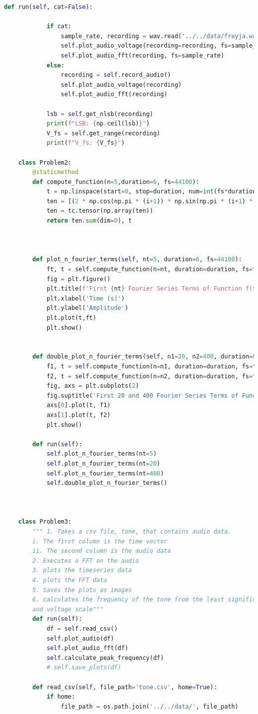 \documentclass[]{report}
\begin{document}
\begin{lstlisting}[language=Python]
		def run(self, cat=False):
		
			if cat:
				sample_rate, recording = wav.read('../../data/freyja.wav', 'rb')
				self.plot_audio_voltage(recording=recording, fs=sample_rate)
				self.plot_audio_fft(recording, fs=sample_rate)
			else:
				recording = self.record_audio()
				self.plot_audio_voltage(recording)
				self.plot_audio_fft(recording)
			
			lsb = self.get_nlsb(recording)
			print(f"LSB: {np.ceil(lsb)}")
			V_fs = self.get_range(recording)
			print(f"V_fs: {V_fs}")
	
	class Problem2:
		@staticmethod
		def compute_function(n=5,duration=6, fs=44100):
			t = np.linspace(start=0, stop=duration, num=int(fs*duration))
			ten = [(2 * np.cos(np.pi * (i+1)) * np.sin(np.pi * (i+1) * t )) / (np.pi * (i+1)) for i in range(n)]
			ten = tc.tensor(np.array(ten))
			return ten.sum(dim=0), t
		
		
		
		def plot_n_fourier_terms(self, nt=5, duration=6, fs=44100):
			ft, t = self.compute_function(n=nt, duration=duration, fs=fs)
			fig = plt.figure()
			plt.title(f'First {nt} Fourier Series Terms of Function f(t)')
			plt.xlabel('Time (s)')
			plt.ylabel('Amplitude')
			plt.plot(t,ft)
			plt.show()
		
		
		def double_plot_n_fourier_terms(self, n1=20, n2=400, duration=6, fs=44100):
			f1, t = self.compute_function(n=n1, duration=duration, fs=fs)
			f2, t = self.compute_function(n=n2, duration=duration, fs=fs)
			fig, axs = plt.subplots(2)
			fig.suptitle('First 20 and 400 Fourier Series Terms of Function f(t)')
			axs[0].plot(t, f1)
			axs[1].plot(t, f2)
			plt.show()
		
		def run(self):
			self.plot_n_fourier_terms(nt=5)
			self.plot_n_fourier_terms(nt=20)
			self.plot_n_fourier_terms(nt=400)
			self.double_plot_n_fourier_terms()
		
		
		
	class Problem3:
		""" 1. Takes a csv file, tone, that contains audio data. 
		i. The first column is the time vector
		ii. The second column is the audio data
		2. Executes a FFT on the audio
		3. plots the timeseries data
		4. plots the FFT data
		5. Saves the plots as images
		6. calculates the frequency of the tone from the least significant bit of the DAQ 
		and voltage scale"""
		def run(self):
			df = self.read_csv()
			self.plot_audio(df)
			self.plot_audio_fft(df)
			self.calculate_peak_frequency(df)
			# self.save_plots(df)
			
		def read_csv(self, file_path='tone.csv', home=True):
			if home:
				file_path = os.path.join('../../data/', file_path)
			

\end{lstlisting}
\end{document}
